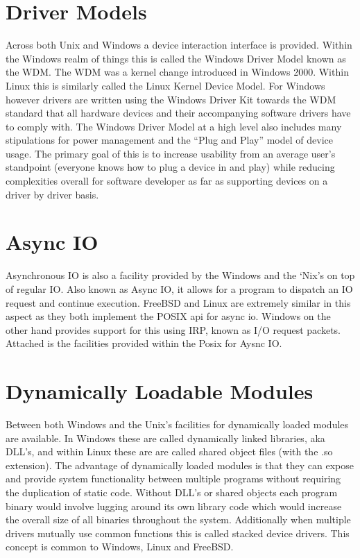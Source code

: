 \documentclass[letterpaper,10pt,draftclsnofoot,onecolumn]{IEEEtran}
\begin{document}
\newpage
\section{Driver Models}
Across both Unix and Windows a device interaction interface is provided. Within the Windows realm of things this is called the Windows Driver Model known as the WDM. The WDM was a kernel change introduced in Windows 2000. Within Linux this is similarly called the Linux Kernel Device Model. For Windows however drivers are written using the Windows Driver Kit towards the WDM standard that all hardware devices and their accompanying software drivers have to comply with. The Windows Driver Model at a high level also includes many stipulations for power management and the “Plug and Play” model of device usage. \cite{russinovich} The primary goal of this is to increase usability from an average user’s standpoint (everyone knows how to plug a device in and play) while reducing complexities overall for software developer as far as supporting devices on a driver by driver basis.\\

\section{Async IO}
Asynchronous IO is also a facility provided by the Windows and the ‘Nix’s on top of regular IO. Also known as Async IO, it allows for a program to dispatch an IO request and continue execution. FreeBSD and Linux are extremely similar in this aspect as they both implement the POSIX api for async io. Windows on the other hand provides support for this using IRP, known as I/O request packets. Attached is the facilities provided within the Posix for Aysnc IO.\\



\section{Dynamically Loadable Modules}
Between both Windows and the Unix’s facilities for dynamically loaded modules are available. In Windows these are called dynamically linked libraries, aka DLL’s, and within Linux these are are called shared object files (with the .so extension). The advantage of dynamically loaded modules is that they can expose and provide system functionality between multiple programs without requiring the duplication of static code. Without DLL’s or shared objects each program binary would involve lugging around its own library code which would increase the overall size of all binaries throughout the system. Additionally when multiple drivers mutually use common functions this is called stacked device drivers. This concept is common to Windows, Linux and FreeBSD.\\
\end{document}
